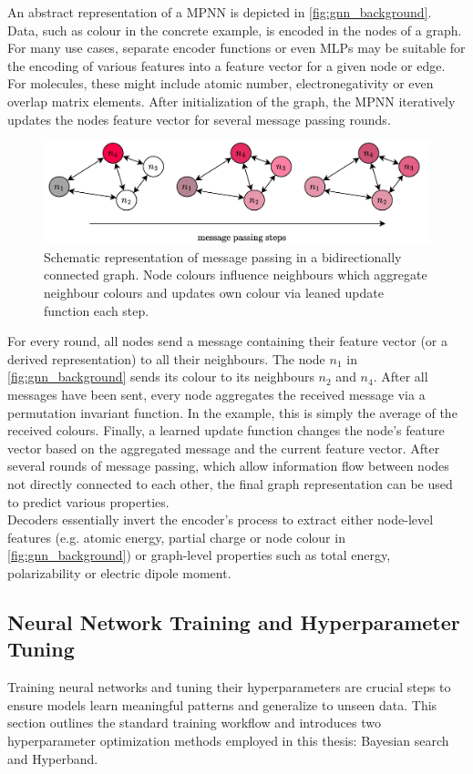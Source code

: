 An abstract representation of a MPNN is depicted in \autoref{fig:gnn_background}. Data, such as colour in the concrete example, is encoded in the nodes of a graph. For many use cases, separate encoder functions or even MLPs may be suitable for the encoding of various features into a feature vector for a given node or edge. For molecules, these might include atomic number, electronegativity or even overlap matrix elements. After initialization of the graph, the MPNN iteratively updates the nodes feature vector for several message passing rounds. 
\begin{figure}[H]
    \centering
    \includegraphics[width=\textwidth]{../fig/background/GNN.pdf}
    \caption[Schematic Message Passing Neural Net]{Schematic representation of message passing in a bidirectionally connected graph. Node colours influence neighbours which aggregate neighbour colours and updates own colour via leaned update function each step.}
    \label{fig:gnn_background}
\end{figure}
For every round, all nodes send a message containing their feature vector (or a derived representation) to all their neighbours. The node $n_1$ in \autoref{fig:gnn_background} sends its colour to its neighbours $n_2$ and $n_4$. After all messages have been sent, every node aggregates the received message via a permutation invariant function. In the example, this is simply the average of the received colours. Finally, a learned update function changes the node's feature vector based on the aggregated message and the current feature vector. After several rounds of message passing, which allow information flow between nodes not directly connected to each other, the final graph representation can be used to predict various properties.\\
Decoders essentially invert the encoder's process to extract either node-level features (e.g. atomic energy, partial charge or node colour in \autoref{fig:gnn_background}) or graph-level properties such as total energy, polarizability or electric dipole moment.\\

\subsection{Neural Network Training and Hyperparameter Tuning}
\label{subsec:background_ml_training}
Training neural networks and tuning their hyperparameters are crucial steps to ensure models learn meaningful patterns and generalize to unseen data. This section outlines the standard training workflow and introduces two hyperparameter optimization methods employed in this thesis: Bayesian search and Hyperband.

